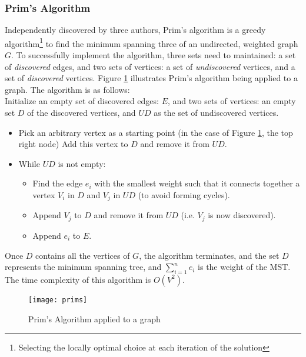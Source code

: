 \documentclass[a4paper,11pt]{article}
\begin{document}
\subsubsection{Prim's Algorithm}
Independently discovered by three authors,  Prim's algorithm \cite{prims}\cite{prims_og}\cite{prims3} is a greedy algorithm\footnote{Selecting the locally optimal choice at each iteration of the solution} to find the minimum spanning three of an undirected,  weighted graph $G$. To successfully implement the algorithm, three sets need to maintained: a set of \textit{discovered} edges, and two sets of vertices: a set of \textit{undiscovered} vertices, and a set of \textit{discovered} vertices.  Figure \ref{fig:prim} illustrates Prim's algorithm being applied to a graph. The algorithm is as follows:\\
Initialize an empty set of discovered edges: $E$, and two sets of vertices: an empty set $D$ of the discovered vertices, and $UD$ as the set of undiscovered vertices.
\begin{itemize}
\item Pick an arbitrary vertex as a starting point (in the case of Figure \ref{fig:prim}, the top right node) Add this vertex to $D$ and remove it from $UD$.
\item While $UD$ is not empty:
	\begin{itemize}
	\item Find the edge $e_i$ with the smallest weight such that it connects together a vertex $V_i$ in $D$ and $V_j$ in $UD$ (to avoid forming cycles).
	\item Append $V_j$ to $D$ and remove it from $UD$ (i.e. $V_j$ is now discovered).
	\item Append $e_i$ to $E$.
	\end{itemize}
\end{itemize}
Once $D$ contains all the vertices of $G$, the algorithm terminates, and the set $D$ represents the minimum spanning tree, and $\sum\limits_{i=1}^n e_i$ is the weight of the MST. The time complexity of this algorithm is $O(V^2)$.
\begin{figure}[H]
\centering\texttt{[image: prims]}
\caption{Prim's Algorithm applied to a graph}\label{fig:prim}
\end{figure}
\end{document}
